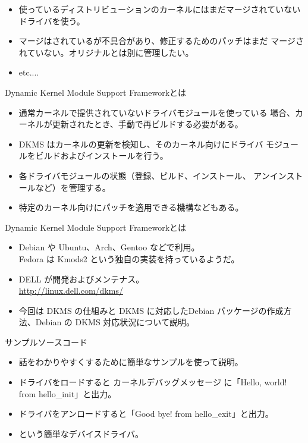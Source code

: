 \begin{frame}

\begin{itemize}
\item 使っているディストリビューションのカーネルにはまだマージされていない
ドライバを使う。
\item マージはされているが不具合があり、修正するためのパッチはまだ
マージされていない。オリジナルとは別に管理したい。
\item etc....
\end{itemize}

\end{frame}


\begin{frame}{Dynamic Kernel Module Support Frameworkとは}

\begin{itemize}
\item 通常カーネルで提供されていないドライバモジュールを使っている
場合、カーネルが更新されたとき、手動で再ビルドする必要がある。
\item DKMS はカーネルの更新を検知し、そのカーネル向けにドライバ
モジュールをビルドおよびインストールを行う。
\item 各ドライバモジュールの状態（登録、ビルド、インストール、
アンインストールなど）を管理する。
\item 特定のカーネル向けにパッチを適用できる機構などもある。
\end{itemize}

\end{frame}

\begin{frame}{Dynamic Kernel Module Support Frameworkとは}

\begin{itemize}
\item Debian や Ubuntu、Arch、Gentoo などで利用。\\
Fedora は Kmods2 という独自の実装を持っているようだ。
\item DELL が開発およびメンテナス。\\
\url{http://linux.dell.com/dkms/}
\item 今回は DKMS の仕組みと DKMS に対応したDebian パッケージの作成方法、Debian の DKMS 対応状況について説明。
\end{itemize}

\end{frame}

\begin{frame}{サンプルソースコード}

\begin{itemize}
\item 話をわかりやすくするために簡単なサンプルを使って説明。
\item ドライバをロードすると カーネルデバッグメッセージ
に「Hello, world! from hello\_init」と出力。
\item ドライバをアンロードすると「Good bye! from hello\_exit」と出力。
\item という簡単なデバイスドライバ。
\end{itemize}

\end{frame}

